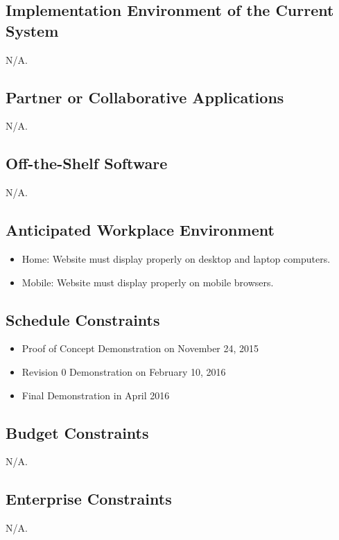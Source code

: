 \documentclass[12pt]{article}
\begin{document}
\subsection{Implementation Environment of the Current System}
N/A.

\subsection{Partner or Collaborative Applications} 
N/A.
    
\subsection{Off-the-Shelf Software} 
N/A.
    
\subsection{Anticipated Workplace Environment} 
    \begin{itemize}
    \item Home: Website must display properly on desktop and laptop computers.
    \item Mobile: Website must display properly on mobile browsers. 
    \end{itemize}
    
\subsection{Schedule Constraints} 
    \begin{itemize}
    \item Proof of Concept Demonstration on November 24, 2015
    \item Revision 0 Demonstration on February 10, 2016
    \item Final Demonstration in April 2016
    \end{itemize}
    
\subsection{Budget Constraints}
    N/A.
    
\subsection{Enterprise Constraints}
    N/A.
\end{document}
